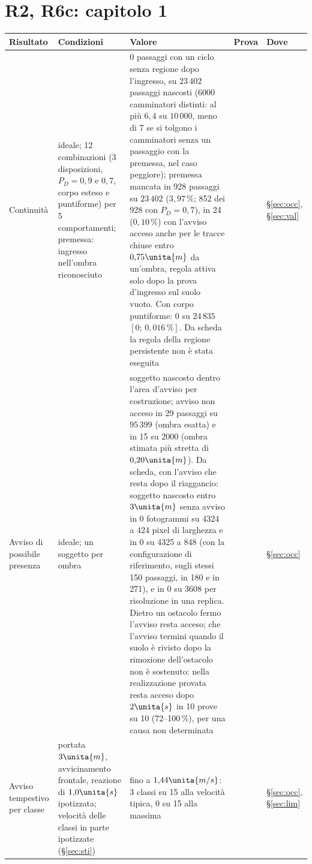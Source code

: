 \section*{R2, R6c: capitolo 1}
\begin{table}[H]\centering\footnotesize
\begin{tabularx}{\textwidth}{@{}>{\RaggedRight\arraybackslash}p{2.8cm}>{\RaggedRight\arraybackslash}p{4.1cm}L>{\RaggedRight\arraybackslash}p{1.2cm}>{\RaggedRight\arraybackslash}p{1.05cm}@{}}
\toprule
Risultato & Condizioni & Valore & Prova & Dove\\
\midrule
Continuità & ideale; 12 combinazioni (3 disposizioni, $P_D=0{,}9$ e $0{,}7$, corpo esteso e puntiforme) per 5 comportamenti; premessa: ingresso nell'ombra riconosciuto & 0 passaggi con un ciclo senza regione dopo l'ingresso, su $23\,402$ passaggi nascosti (6000 camminatori distinti: al più $6{,}4$ su $10\,000$, meno di 7 se si tolgono i camminatori senza un passaggio con la premessa, nel caso peggiore); premessa mancata in 928 passaggi su $23\,402$ ($3{,}97\,\%$; 852 dei 928 con $P_D=0{,}7$), in 24 ($0{,}10\,\%$) con l'avviso acceso anche per le tracce chiuse entro $0{,}75\unita{m}$ da un'ombra, regola attiva solo dopo la prova d'ingresso sul suolo vuoto. Con corpo puntiforme: 0 su $24\,835$ $[0;\,0{,}016\,\%]$. Da scheda la regola della regione persistente non è stata eseguita &  & \S\ref{sec:occ}, \S\ref{sec:val}\\
Avviso di possibile presenza & ideale; un soggetto per ombra & soggetto nascosto dentro l'area d'avviso per costruzione; avviso non acceso in 29 passaggi su $95\,399$ (ombra esatta) e in 15 su 2000 (ombra stimata più stretta di $0{,}20\unita{m}$). Da scheda, con l'avviso che resta dopo il riaggancio: soggetto nascosto entro $3\unita{m}$ senza avviso in 0 fotogrammi su 4324 a 424 pixel di larghezza e in 0 su 4325 a 848 (con la configurazione di riferimento, sugli stessi 150 passaggi, in 180 e in 271), e in 0 su 3608 per risoluzione in una replica. Dietro un ostacolo fermo l'avviso resta acceso; che l'avviso termini quando il suolo è rivisto dopo la rimozione dell'ostacolo non è sostenuto: nella realizzazione provata resta acceso dopo $2\unita{s}$ in 10 prove su 10 (72--100\,\%), per una causa non determinata &  & \S\ref{sec:occ}\\
Avviso tempestivo per classe & portata $3\unita{m}$, avvicinamento frontale, reazione di $1{,}0\unita{s}$ ipotizzata; velocità delle classi in parte ipotizzate (\S\ref{sec:sti}) & fino a $1{,}44\unita{m/s}$: 3 classi su 15 alla velocità tipica, 0 su 15 alla massima &  & \S\ref{sec:occ}, \S\ref{sec:lim}\\
\bottomrule
\end{tabularx}
\end{table}
